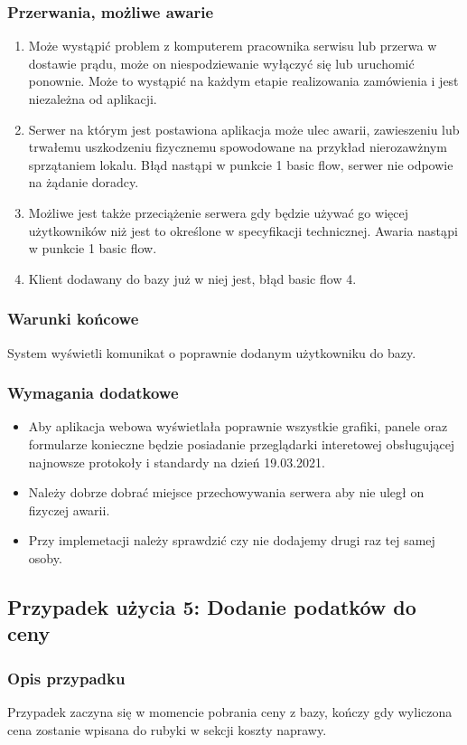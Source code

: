 \documentclass{article}
\begin{document}
\subsubsection{Przerwania, możliwe awarie}
\begin{enumerate}
    \item Może wystąpić problem z komputerem pracownika serwisu lub przerwa w dostawie prądu, może on niespodziewanie wyłączyć się lub uruchomić ponownie. Może to wystąpić na każdym etapie realizowania zamówienia i jest niezależna od aplikacji.
    \item Serwer na którym jest postawiona aplikacja może ulec awarii, zawieszeniu lub trwałemu uszkodzeniu fizycznemu spowodowane na przykład nierozawżnym sprzątaniem lokalu. Błąd nastąpi w punkcie 1 basic flow, serwer nie odpowie na żądanie doradcy.
    \item Możliwe jest także przeciążenie serwera gdy będzie używać go więcej użytkowników niż jest to określone w specyfikacji technicznej. Awaria nastąpi w punkcie 1 basic flow.
    \item Klient dodawany do bazy już w niej jest, błąd basic flow 4.
\end{enumerate}
\subsubsection{Warunki końcowe}
System wyświetli komunikat o poprawnie dodanym użytkowniku do bazy.
\subsubsection{Wymagania dodatkowe}
\begin{itemize}
    \item Aby aplikacja webowa wyświetlała poprawnie wszystkie grafiki, panele oraz formularze konieczne będzie posiadanie przeglądarki interetowej obsługującej najnowsze protokoły i standardy na dzień 19.03.2021.
    \item Należy dobrze dobrać miejsce przechowywania serwera aby nie uległ on fizyczej awarii.
    \item Przy implemetacji należy sprawdzić czy nie dodajemy drugi raz tej samej osoby.
\end{itemize}
\subsection{Przypadek użycia 5: Dodanie podatków do ceny}
\subsubsection{Opis przypadku}
Przypadek zaczyna się w momencie pobrania ceny z bazy, kończy gdy wyliczona cena zostanie wpisana do rubyki w sekcji koszty naprawy.
\end{document}
